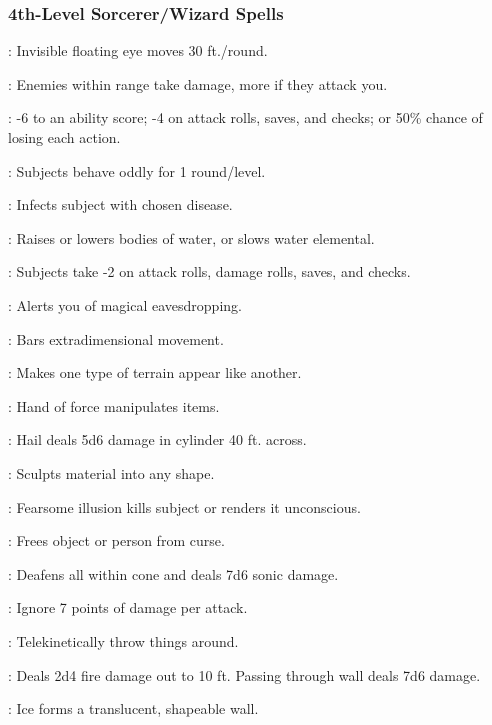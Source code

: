 \subsubsection{4th-Level Sorcerer/Wizard Spells}
\begin{list}{}{\leftmargin=1em}
\item {}: Invisible floating eye moves 30 ft./round.
\item {}: Enemies within range take damage, more if they attack you.
\item {}: -6 to an ability score; -4 on attack rolls, saves, and checks; or 50\% chance of losing each action.
\item {}: Subjects behave oddly for 1 round/level.
\item {}: Infects subject with chosen disease.
\item {}: Raises or lowers bodies of water, or slows water elemental.
\item {}: Subjects take -2 on attack rolls, damage rolls, saves, and checks.
\item {}: Alerts you of magical eavesdropping.
\item {}: Bars extradimensional movement.
\item {}: Makes one type of terrain appear like another.
\item {}: Hand of force manipulates items.
\item {}: Hail deals 5d6 damage in cylinder 40 ft. across.
\item {}: Sculpts material into any shape.
\item {}: Fearsome illusion kills subject or renders it unconscious.
\item {}: Frees object or person from curse.
\item {}: Deafens all within cone and deals 7d6 sonic damage.
\item {}: Ignore 7 points of damage per attack.
\item {}: Telekinetically throw things around.
\item {}: Deals 2d4 fire damage out to 10 ft. Passing through wall deals 7d6 damage.
\item {}: Ice forms a translucent, shapeable wall.
\end{list}

